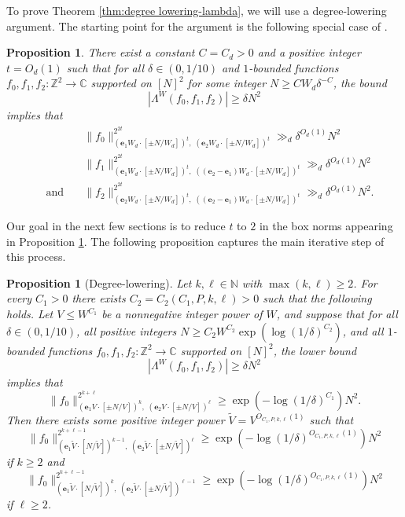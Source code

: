 \documentclass[11pt]{amsart}
\newtheorem{proposition}[lemma]{Proposition}
\theoremstyle{definition}
\newcommand{\Z}{{\mathbb Z}}
\newcommand{\be}{{\mathbf{e}}}
\begin{document}
 To prove Theorem \ref{thm:degree lowering-lambda}, we will use a degree-lowering argument.  The starting point for the argument is the following special case of \cite[Theorem 1.2]{KKL24a}. 
\begin{proposition}\label{P: preliminary box control for Lambda^W}
There exist a constant $C=C_d>0$ and a positive integer $t = O_d(1)$ such that for all $\delta\in(0, 1/10)$ and $1$-bounded functions $f_0,f_1,f_2: \Z^2 \to \mathbb{C}$ supported on $[N]^2$ {for some integer $N\geq C W_d\delta^{-C}$,} the bound
    $$|\Lambda^W(f_0,f_1,f_2)| \geq \delta N^{2}$$
implies that
\begin{align*}
&\|f_0\|_{(\be_1 W_d\cdot [\pm N/W_d])^t,\; (\be_2 W_d\cdot [\pm N/W_d])^t}^{2^{2t}} \gg_d \delta^{O_d(1)} N^2\\
&\|f_1\|_{(\be_1 W_d\cdot [\pm N/W_d])^t,\; ((\be_2-\be_1) W_d\cdot [\pm N/W_d])^t}^{2^{2t}} \gg_d \delta^{O_d(1)} N^2\\
\quad \text{and} \quad &\|f_2\|_{(\be_2 W_d\cdot [\pm N/W_d])^t,\; ((\be_2-\be_1) W_d\cdot [\pm N/W_d])^t}^{2^{2t}} \gg_d \delta^{O_d(1)} N^2.
\end{align*}
\end{proposition}


Our goal in the next few sections is to reduce $t$ to $2$ in the box norms appearing in Proposition \ref{P: preliminary box control for Lambda^W}. The following proposition captures the main iterative step of this process.
\begin{proposition}[Degree-lowering]\label{prop:degreeloweringdual}
Let $k,\ell \in \mathbb{N}$ with $\max(k,\ell) \geq 2$. For every $C_1>0$ there exists $C_2 = C_2(C_1, P, k, \ell)>0$ such that the following holds. Let $V \leq W^{C_1}$ be a nonnegative integer power of $W$, and suppose that for all $\delta\in(0, 1/10)$, all positive integers $N \geq C_2 W^{C_2}\exp(\log(1/\delta)^{C_2})$, and all $1$-bounded functions $f_0, f_1, f_2: \Z^2 \to \mathbb{C}$ supported on $[N]^2$, the lower bound
$$|\Lambda^W(f_0, f_1, f_2)| \ge \delta N^2$$
implies that
$$\|f_0\|_{(\be_1V \cdot [\pm N/V])^k,\; (\be_2 V \cdot [\pm N/V])^\ell}^{2^{k+\ell}} \geq \exp(-\log(1/\delta)^{C_1}) N^2.$$
Then 
there exists some positive integer power $\tilde{V} = V^{O_{C_1,P,k,\ell}(1)}$ such that
$$\|f_0\|_{(\be_1\tilde{V} \cdot [N/\tilde{V}])^{k - 1},\; (\be_2 \tilde{V} \cdot [\pm N/\tilde{V}])^\ell}^{2^{k+\ell-1}} \ge \exp(-\log(1/\delta)^{O_{C_1,P,k,\ell}(1)})N^2$$
if $k \ge 2$ and
$$\|f_0\|_{(\be_1\tilde{V} \cdot [N/\tilde{V}])^{k},\; (\be_2 \tilde{V} \cdot [\pm N/\tilde{V}])^{\ell - 1}}^{2^{k+\ell-1}} \ge \exp(-\log(1/\delta)^{O_{C_1,P,k,\ell}(1)})N^2$$
if $\ell \ge 2$.
\end{proposition}
\end{document}
